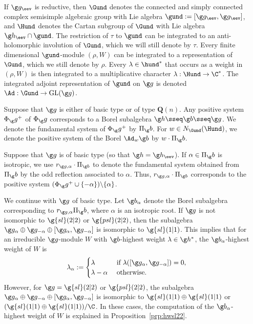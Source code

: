 \documentclass[12pt]{amsart}
\begin{document}
If $\g g_\eev$ is reductive, then  $\Gund$ denotes the connected and simply connected complex semisimple algebraic group with Lie algebra $\gund:=[\g g_\eev,\g g_\eev]$, and 
$\Hund$ denotes the Cartan subgroup of $\Gund$ with Lie algebra $\g h_\eev\cap \gund$. The restriction of 
$\tau$  to $\gund$ can be integrated to an  anti-holomorphic
involution of $\Gund$, which we will still denote by $\tau$. 
Every finite dimensional $\gund$-module $(\rho,W)$ can be integrated to a representation of $\Gund$, which we still denote by $\rho$. Every $\lambda\in\hund^*$ that occurs as a weight in $(\rho,W)$ is then integrated to a multiplicative character $\lambda:\Hund\to \C^*$. The integrated adjoint representation of $\gund$ on $\g g$ is denoted $\Ad:\Gund\to\mathrm{GL}(\g g)$. 

Suppose that $\g g$ is either of basic type or of type $\mathbf Q(n)$. Any positive system $\Phi_\g g^+$ of $\Phi_\g g$ corresponds to a Borel subalgebra   $\g h\sseq \g b\sseq \g g$. 
We denote the fundamental system of $\Phi_\g g^+$ by $\Pi_\g b$. 
For  $w\in N_{\Gund}(\Hund)$, we denote the positive system of the Borel $\Ad_w\g b$ by $w\cdot \Pi_\g b$. 

Suppose that $\g g$ is of basic type (so that $\g h=\g h_\eev$). If $\alpha\in\Pi_\g b$ is isotropic, we use 
$r_{\g g,\alpha}\cdot \Pi_{\g b}$ to denote the fundamental system obtained from $\Pi_\g b$ by the odd reflection associated to  $\alpha$. 
Thus, $r_{\g g,\alpha}\cdot \Pi_{\g b}$ corresponds to the positive system $(\Phi_\g g^+\cup\{-\alpha\})\backslash\{\alpha\}$. \begin{rmk}
\label{rmk:hwodd-sl22}
We continue with $\g g$ of basic type. Let $\g b_{\alpha}$ denote the Borel subalgebra corresponding to $r_{\g g,\alpha}\Pi_\g b$, where $\alpha$ is an isotropic root.
If $\g g$ is not isomorphic to $\g{sl}(2|2)$ or $\g{psl}(2|2)$, then the subalgebra $\g g_\alpha\oplus \g g_{-\alpha}\oplus [\g g_\alpha,\g g_{-\alpha}]$ is isomorphic to $\g{sl}(1|1)$. This implies that  for  an irreducible $\g g$-module $W$ with $\g b$-highest weight $\lambda\in\g h^*$,  the $\g b_\alpha$-highest weight of $W$ is
\[
\lambda_\alpha:=\begin{cases}
\lambda& \text{ if }\lambda([\g g_\alpha,\g g_{-\alpha}])=0,\\
\lambda-\alpha&\text{ otherwise.}
\end{cases}
\] 
However,  for $\g g=\g{sl}(2|2)$ or $\g{psl}(2|2)$, the subalgebra 
$\g g_\alpha\oplus \g g_{-\alpha}\oplus [\g g_\alpha,\g g_{-\alpha}]$ is isomorphic to $\g{sl}(1|1)\oplus\g{sl}(1|1)$ or $(\g{sl}(1|1)\oplus\g{sl}(1|1))/\C$.
In these cases, the computation of the $\g b_\alpha$-highest weight of $W$ is explained in Proposition~\ref{prp:hwsl22}.\end{rmk}
\end{document}
